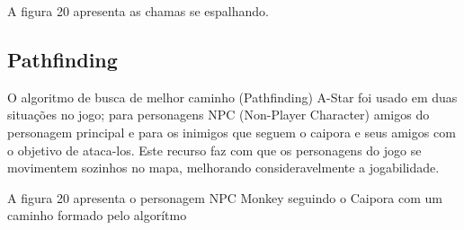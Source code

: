 A figura 20 apresenta as chamas se espalhando.

\begin{figure}[h!]
		\centering
	\end{figure}
	
	
	
\subsection{Pathfinding}
O algoritmo de busca de melhor caminho (Pathfinding) A-Star foi usado em duas situações no jogo; para personagens NPC (Non-Player Character) amigos do personagem principal e para os inimigos que seguem o caipora e seus amigos com o objetivo de ataca-los.  Este recurso faz com que os personagens do jogo se movimentem sozinhos no mapa, melhorando consideravelmente a jogabilidade.


A figura 20 apresenta o personagem NPC Monkey seguindo o Caipora com um caminho formado pelo algorítmo

\begin{figure}[h!]
		\centering
	\end{figure}
	
